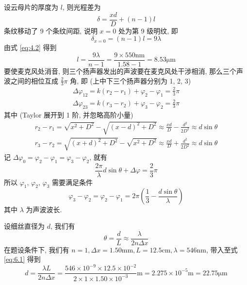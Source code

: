 \documentclass[11pt]{homework}
\begin{document}
\maketitle
\setcounter{questionCounter}{3}
\question
设云母片的厚度为 $l$, 则光程差为
\begin{equation}
    \delta = \frac{xd}{D} + (n - 1)l
\end{equation}
条纹移动了 9 个条纹间距, 说明 $x = 0$ 处为第 9 级明纹, 即
\begin{equation}
    \label{eq:4.2}
    \delta_{x=0}=(n-1)l=9\lambda
\end{equation}
由式 \ref{eq:4.2} 得到
\begin{equation}
    l=\frac{9\lambda}{n-1}=\frac{9\times550\mathrm{nm}}{1.58-1}=8.53\mathrm{\mu m}
\end{equation}
\question
要使麦克风处消音, 则三个扬声器发出的声波要在麦克风处干涉相消, 那么三个声波之间的相位互成 $\frac{2}{3}\pi$ 角, 即 (上中下三个扬声器分别为 1, 2, 3)
\begin{gather}
    \Delta\varphi_{12} = k(r_2-r_1)+\varphi_{2}-\varphi_{1} = \frac{2}{3}\pi\\
    \Delta\varphi_{23} = k(r_3-r_2)+\varphi_{3}-\varphi_{2} = \frac{2}{3}\pi
\end{gather}
其中 (Taylor 展开到 1 阶, 并忽略高阶小量)
\begin{gather}
    r_2-r_1=\sqrt{x^2+D^2}-\sqrt{\left(x-d\right)^2+D^2}\approx\frac{xd}{D} - \frac{d^2}{2D^2} \approx d\sin\theta\\
    r_3-r_2=\sqrt{\left(x+d\right)^2+D^2}-\sqrt{x^2+D^2}\approx\frac{xd}{D} + \frac{d^2}{2D^2} \approx d\sin\theta
\end{gather}
记 $\Delta\varphi_0 = \varphi_{2}-\varphi_{1} = \varphi_{3}-\varphi_{2}$, 就有
\begin{equation}
\frac{2\pi}{\lambda}d\sin\theta + \Delta\varphi=\frac{2}{3}\pi
\end{equation}
所以 $\varphi_1$, $\varphi_2$, $\varphi_3$ 需要满足条件
\begin{equation}
    \varphi_3-\varphi_2=\varphi_2-\varphi_1=2\pi\left(\frac{1}{3}-\frac{d\sin\theta}{\lambda}\right)
\end{equation}
其中 $\lambda$ 为声波波长.

\question
设细丝直径为 $d$, 我们有
\begin{equation}
    \label{eq:6.1}
    \theta = \frac{d}{L} \approx \frac{\lambda}{2n\Delta x}
\end{equation}
\newpage
在题设条件下, 我们有 $n = 1, \Delta x = 1.50\mathrm{mm}, L=12.5\mathrm{cm}, \lambda = 546\mathrm{nm}$, 带入至式 \ref{eq:6.1} 得到
\begin{equation}
    d = \frac{\lambda L}{2n\Delta x} = \frac{546\times 10^{-9}\times 12.5\times 10^{-2}}{2\times 1\times 1.50\times 10^{-3}}\mathrm{m} = 2.275\times 10^{-5} \mathrm{m} = 22.75 \mathrm{\mu m}
\end{equation}
\end{document}
